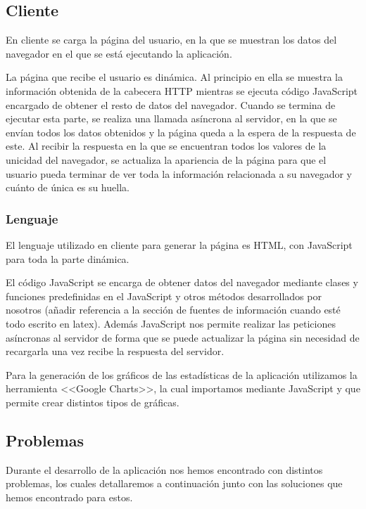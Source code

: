 \subsection{Cliente}
En cliente se carga la página del usuario, en la que se muestran los datos del navegador en el que se está ejecutando la aplicación.\par
La página que recibe el usuario es dinámica. Al principio en ella se muestra la información obtenida de la cabecera HTTP mientras se ejecuta código JavaScript encargado de obtener el resto de datos del navegador. Cuando se termina de ejecutar esta parte, se realiza una llamada asíncrona al servidor, en la que se envían todos los datos obtenidos y la página queda a la espera de la respuesta de este. Al recibir la respuesta en la que se encuentran todos los valores de la unicidad del navegador, se actualiza la apariencia de la página para que el usuario pueda terminar de ver toda la información relacionada a su navegador y cuánto de única es su huella. 
\subsubsection{Lenguaje}
El lenguaje utilizado en cliente para generar la página es HTML, con JavaScript para toda la parte dinámica.\par
El código JavaScript se encarga de obtener datos del navegador mediante clases y funciones predefinidas en el JavaScript y otros métodos desarrollados por nosotros (añadir referencia a la sección de fuentes de información cuando esté todo escrito en latex). Además JavaScript nos permite realizar las peticiones asíncronas al servidor de forma que se puede actualizar la página sin necesidad de recargarla una vez recibe la respuesta del servidor.\par 
Para la generación de los gráficos de las estadísticas de la aplicación utilizamos la herramienta <<Google Charts>>, la cual importamos mediante JavaScript y que permite crear distintos tipos de gráficas.
\subsection{Problemas}
Durante el desarrollo de la aplicación nos hemos encontrado con distintos problemas, los cuales detallaremos a continuación junto con las soluciones que hemos encontrado para estos.
